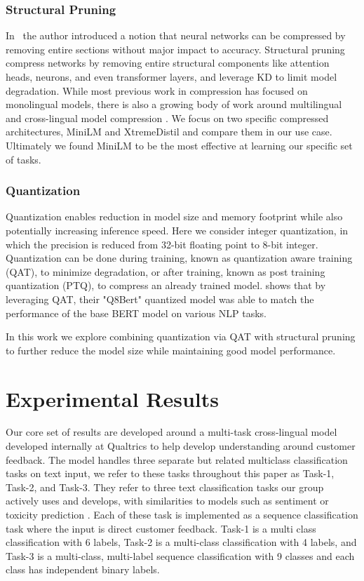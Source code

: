 \subsubsection{Structural Pruning}
In~\cite{LeCun1989OptimalBD} the author introduced a notion that neural networks can be compressed by removing entire sections without major impact to accuracy. 
Structural pruning compress networks by removing entire structural components like attention heads, neurons, and even transformer layers, and leverage KD to limit model degradation.
While most previous work in compression has focused on monolingual models, there is also a growing body of work around multilingual and cross-lingual model compression \cite{jiao2021lightmbert,mukherjee2020xtremedistil,mukherjee2021xtremedistiltransformers,wang2020minilm,wang2020minilmv2}.
We focus on two specific compressed architectures, MiniLM \cite{wang2020minilmv2} and XtremeDistil \cite{mukherjee2021xtremedistiltransformers} and compare them in our use case.
Ultimately we found MiniLM to be the most effective at learning our specific set of tasks.

\subsubsection{Quantization}
Quantization enables reduction in model size and memory footprint while also potentially increasing inference speed.
Here we consider integer quantization, in which the precision is reduced from 32-bit floating point to 8-bit integer.
Quantization can be done during training, known as quantization aware training (QAT), to minimize degradation, or after training, known as post training quantization (PTQ), to compress an already trained model.
\cite{zafrir2019} shows that by leveraging QAT, their "Q8Bert" quantized model was able to match the performance of the base BERT model on various NLP tasks.

In this work we explore combining quantization via QAT with structural pruning to further reduce the model size while maintaining good model performance.

\section{Experimental Results}
Our core set of results are developed around a multi-task cross-lingual model developed internally at Qualtrics to help develop understanding around customer feedback.
The model handles three separate but related multiclass classification tasks on text input, we refer to these tasks throughout this paper as Task-1, Task-2, and Task-3.
They refer to three text classification tasks our group actively uses and develops, with similarities to models such as sentiment or toxicity prediction \cite{he2019interactive}.
Each of these task is implemented as a sequence classification task where the input is direct customer feedback. 
Task-1 is a multi class classification with 6 labels, 
Task-2 is a multi-class classification with 4 labels, and
Task-3 is a multi-class, multi-label sequence classification with 9 classes and each class has independent binary labels. \\


